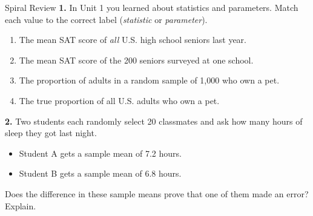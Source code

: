 \documentclass[10pt]{article}
\begin{document}
\namedateperiod

\vspace{0.15in}

\begin{notesbox}{Spiral Review}
\textbf{1.} In Unit 1 you learned about statistics and parameters. Match each value to
the correct label (\emph{statistic} or \emph{parameter}).

\vspace{0.1in}
\begin{enumerate}[label=\alph*.]
  \item The mean SAT score of \emph{all} U.S. high school seniors last year.
        \hfill \blank{3.2cm}
  \item The mean SAT score of the 200 seniors surveyed at one school.
        \hfill \blank{3.2cm}
  \item The proportion of adults in a random sample of 1,000 who own a pet.
        \hfill \blank{3.2cm}
  \item The true proportion of all U.S. adults who own a pet.
        \hfill \blank{3.2cm}
\end{enumerate}

\vspace{0.15in}
\textbf{2.} Two students each randomly select 20 classmates and ask how many hours of
sleep they got last night.
\begin{itemize}
  \item Student A gets a sample mean of 7.2 hours.
  \item Student B gets a sample mean of 6.8 hours.
\end{itemize}

Does the difference in these sample means prove that one of them made an error?
Explain. 
\end{notesbox}
\end{document}
